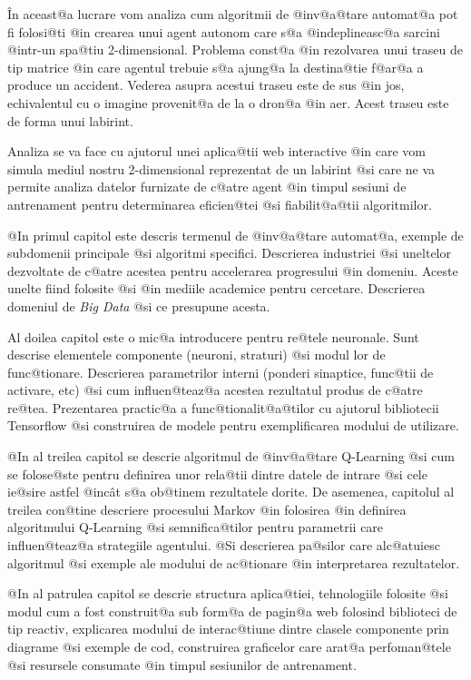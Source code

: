 \^ In aceast@a lucrare vom analiza cum algoritmii de @inv@a@tare automat@a  pot fi folosi@ti @in crearea unui agent autonom care s@a @indeplineasc@a sarcini @intr-un spa@tiu 2-di\-men\-sio\-nal. Problema const@a @in rezolvarea unui traseu de tip matrice @in care agentul trebuie s@a ajung@a la destina@tie f@ar@a a produce un accident. Vederea asupra acestui traseu este de sus @in jos, echivalentul cu o imagine provenit@a de la o dron@a @in aer. Acest traseu este de forma unui labirint.  

Analiza se va face cu ajutorul unei aplica@tii web interactive @in care vom simula mediul nostru 2-di\-men\-sio\-nal reprezentat de un labirint @si care ne va permite analiza datelor furnizate de c@atre agent @in timpul sesiuni de antrenament pentru determinarea eficien@tei @si fiabilit@a@tii algoritmilor.


\hspace{0.2cm}

@In primul capitol este descris termenul de @inv@a@tare automat@a, exemple de subdomenii principale @si algoritmi specifici. Descrierea industriei @si uneltelor dezvoltate de c@atre acestea pentru accelerarea progresului @in domeniu. Aceste unelte fiind folosite @si @in mediile academice pentru cercetare. Descrierea domeniul de \textsl{Big Data} @si ce presupune acesta.

Al doilea capitol este o mic@a introducere pentru re@tele neuronale. Sunt descrise elementele componente (neuroni, straturi) @si modul lor de func@tionare. Descrierea parametrilor interni (ponderi sinaptice, func@tii de activare, etc) @si cum influen@teaz@a acestea rezultatul produs de c@atre re@tea. Prezentarea practic@a a func@tionalit@a@tilor cu ajutorul bibliotecii Tensorflow @si construirea de modele pentru exemplificarea modului de utilizare.

@In al treilea capitol se descrie algoritmul de @inv@a@tare Q-Learning @si cum se folose@ste pentru definirea unor rela@tii dintre datele de intrare @si cele ie@sire astfel @inc\^ at s@a ob@tinem rezultatele dorite. De asemenea, capitolul al treilea con@tine descriere procesului Markov @in folosirea @in definirea algoritmului Q-Learning @si semnifica@tilor pentru parametrii care influen@teaz@a strategiile agentului. @Si des\-cri\-e\-rea pa@silor care alc@atuiesc algoritmul @si exemple ale modului de ac@tionare @in interpretarea rezultatelor.

@In al patrulea capitol se descrie structura aplica@tiei, tehnologiile folosite @si modul cum a fost construit@a sub form@a de pagin@a web folosind biblioteci de tip reactiv, explicarea modului de interac@tiune dintre clasele componente prin diagrame @si exemple de cod, construirea graficelor care arat@a perfoman@tele @si resursele consumate @in timpul sesiunilor de antrenament. 

